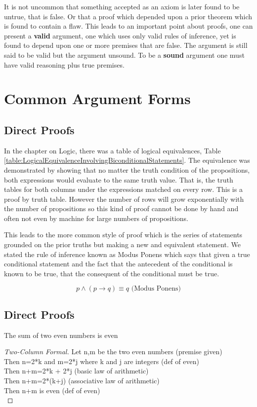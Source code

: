 It is not uncommon that something accepted as an axiom is later found to be untrue, that is false. Or that a proof which depended upon a prior theorem which is found to contain a flaw. This leads to an important point about proofs, one can present a \textbf{valid} argument, one which uses only valid rules of inference, yet is found to depend upon one or more premises that are false. The argument is still said to be valid but the argument unsound. To be a \textbf{sound} argument one must have valid reasoning plus true premises. 



\section{Common Argument Forms}
\subsection {Direct Proofs}
In the chapter on Logic, there was a table of logical equivalences, Table \ref{table:LogicalEquivalenceInvolvingBiconditionalStatements}. The equivalence was demonstrated by showing that no matter the truth condition of the propositions, both expressions would evaluate to the same truth value. That is, the truth tables for both columns under the expressions matched on every row. This is a proof by truth table. However the number of rows will grow exponentially with the number of propositions so this kind of proof cannot be done by hand and often not even by machine for large numbers of propositions. 

This leads to the more common style of proof which is the series of statements grounded on the prior truths but making a new and equivalent statement. We stated the rule of inference known as Modus Ponens which says that given a true conditional statement and the fact that the antecedent of the conditional is known to be true, that the consequent of the conditional must be true. 

$$p \land (p \rightarrow q) \equiv q  \text{    (Modus Ponens)}$$
    
    
  \subsection {Direct Proofs}
\begin {theorem}
The sum of two even numbers is even
\begin{proof}[Two-Column Formal]
Let n,m be the two even numbers (premise given)\\
Then n=2*k and m=2*j where k and j are integers (def of even)\\
Then n+m=2*k + 2*j (basic law of arithmetic)\\
Then n+m=2*(k+j) (associative law of arithmetic)\\
Then n+m is even (def of even)   \\
\end{proof}
\end{theorem}

